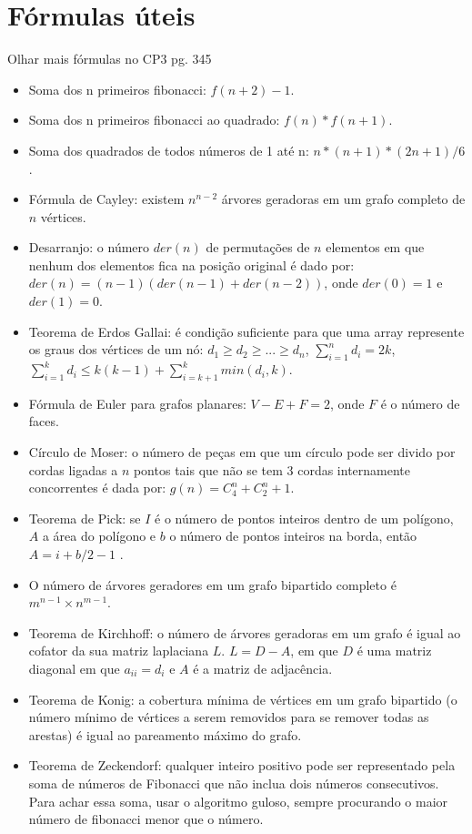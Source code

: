 \section{Fórmulas úteis}
Olhar mais fórmulas no CP3 pg. 345
\begin{itemize}
\itemsep0em
\item Soma dos n primeiros fibonacci: $f(n+2)-1$.
\item Soma dos n primeiros fibonacci ao quadrado: $f(n)*f(n+1)$.
\item Soma dos quadrados de todos números de 1 até n:   $n*(n+1)*(2n+1)/6$.
\item Fórmula de Cayley: existem $n^{n-2}$ árvores geradoras em um grafo completo de $n$ vértices.
\item Desarranjo: o número $der(n)$ de permutações de $n$ elementos em que nenhum dos elementos fica na posição original é dado por:
$der(n) = (n-1)(der(n-1)+der(n-2))$, onde $der(0) = 1$ e $der(1) = 0$.
\item Teorema de Erdos Gallai: é condição suficiente para que uma array represente os graus dos vértices de um nó: $d_1 \geq d_2 \geq ... \geq d_n$, $\sum_{i=1}^{n}d_i = 2k$, $\sum_{i=1}^{k}d_i \leq k(k-1) + \sum_{i=k+1}^{k}min(d_i, k)$.
\item Fórmula de Euler para grafos planares: $V-E+F=2$, onde $F$ é o número de faces.
\item Círculo de Moser: o número de peças em que um círculo pode ser divido por cordas ligadas a $n$ pontos tais que não se tem 3 cordas internamente concorrentes é dada por: $g(n) = C_{4}^{n}+C_{2}^{n}+1$.
\item Teorema de Pick: se $I$ é o número de pontos inteiros dentro de um polígono, $A$ a área do polígono e $b$ o número de pontos inteiros na borda, então $A = i + b/2 - 1$ .
\item O número de árvores geradores em um grafo bipartido completo é $m^{n-1} \times n^{m-1}$.
\item Teorema de Kirchhoff: o número de árvores geradoras em um grafo é igual ao cofator da sua matriz laplaciana $L$. $L=D-A$, em que $D$ é uma matriz diagonal em que $a_{ii} = d_i$ e $A$ é a matriz de adjacência.
\item Teorema de Konig: a cobertura mínima de vértices em um grafo bipartido (o número mínimo de vértices a serem removidos para se remover todas as arestas) é igual ao pareamento máximo do grafo.
\item Teorema de Zeckendorf: qualquer inteiro positivo pode ser representado pela soma de números de Fibonacci que não inclua dois números consecutivos. Para achar essa soma, usar o algoritmo guloso, sempre procurando o maior número de fibonacci menor que o número.

\end{itemize}
